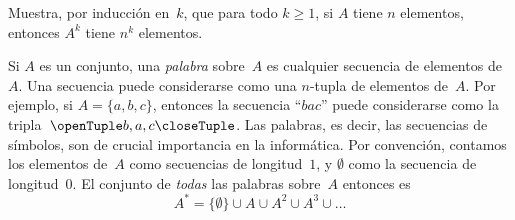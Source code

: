 \documentclass[../../../include/open-logic-section]{subfiles}
\begin{document}
\begin{prob}
Muestra, por inducción en~$k$, que para todo $k \ge 1$, si $A$ tiene $n$ elementos, entonces $A^k$ tiene $n^k$ elementos.
\end{prob}

\begin{ex}
Si $A$ es un conjunto, una \emph{palabra} sobre~$A$ es cualquier secuencia de elementos de~$A$. Una secuencia puede considerarse como una $n$-tupla de elementos de~$A$. Por ejemplo, si $A = \{a, b, c\}$, entonces la secuencia ``$bac$'' puede considerarse como la tripla~$\tuple{b, a, c}$. Las palabras, es decir, las secuencias de símbolos, son de crucial importancia en la informática. Por convención, contamos los elementos de~$A$ como secuencias de longitud~$1$, y $\emptyset$ como la secuencia de longitud~$0$. El conjunto de \emph{todas} las palabras sobre~$A$ entonces es
\[
A^* = \{\emptyset\} \cup A \cup A^2 \cup A^3 \cup \dots
\]
\end{ex}
\end{document}
